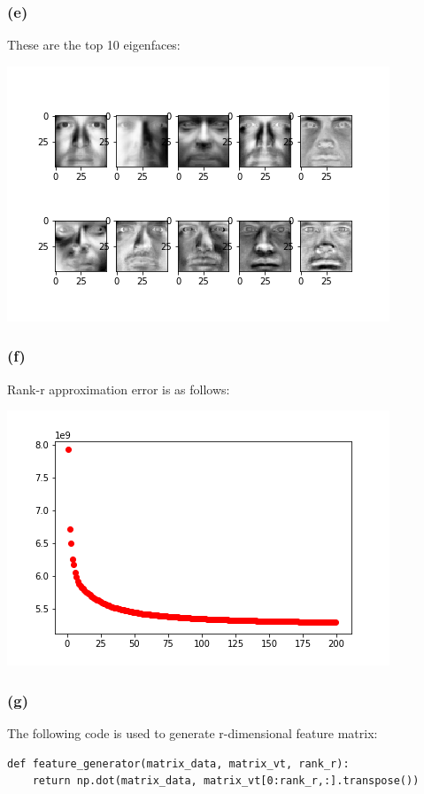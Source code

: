 \documentclass[12pt]{article}
\begin{document}
{\subsubsection*{(e)}
These are the top 10 eigenfaces: 
\begin{center}
\includegraphics[scale=1]{P1/Top_10_Eigenfaces.png}
\end{center}

\subsubsection*{(f)}
Rank-r approximation error is as follows: 
\begin{center}
\includegraphics[scale=0.8]{P1/Rank_r_approximation_error.png}
\end{center}

\subsubsection*{(g)}
The following code is used to generate r-dimensional feature matrix: 
\begin{lstlisting}
def feature_generator(matrix_data, matrix_vt, rank_r):
    return np.dot(matrix_data, matrix_vt[0:rank_r,:].transpose())


\end{lstlisting}}
\end{document}
